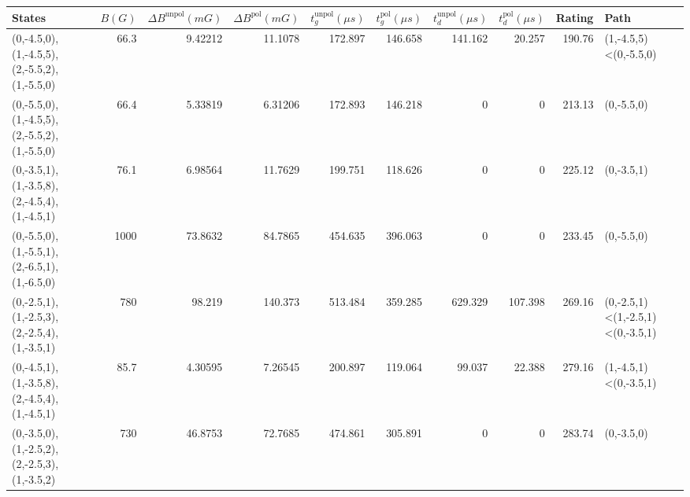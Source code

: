 \begin{tabular}{lrrrrrrrrl}
\hline
 {States}                                    &   {$B(G)$} &   {$\Delta B^{\text{unpol}}(mG)$} &   {$\Delta B^{\text{pol}}(mG)$} &   {$t^{\text{unpol}}_{g}(\mu s)$} &   {$t^{\text{pol}}_{g}(\mu s)$} &   {$t^{\text{unpol}}_{d}(\mu s)$} &   {$t^{\text{pol}}_{d}(\mu s)$} &   {Rating} & {Path}                           \\
\hline
 (0,-4.5,0),(1,-4.5,5),(2,-5.5,2),(1,-5.5,0) &       66.3 &                           9.42212 &                        11.1078  &                           172.897 &                         146.658 &                           141.162 &                          20.257 &     190.76 & (1,-4.5,5)<(0,-5.5,0)            \\
 (0,-5.5,0),(1,-4.5,5),(2,-5.5,2),(1,-5.5,0) &       66.4 &                           5.33819 &                         6.31206 &                           172.893 &                         146.218 &                             0     &                           0     &     213.13 & (0,-5.5,0)                       \\
 (0,-3.5,1),(1,-3.5,8),(2,-4.5,4),(1,-4.5,1) &       76.1 &                           6.98564 &                        11.7629  &                           199.751 &                         118.626 &                             0     &                           0     &     225.12 & (0,-3.5,1)                       \\
 (0,-5.5,0),(1,-5.5,1),(2,-6.5,1),(1,-6.5,0) &     1000   &                          73.8632  &                        84.7865  &                           454.635 &                         396.063 &                             0     &                           0     &     233.45 & (0,-5.5,0)                       \\
 (0,-2.5,1),(1,-2.5,3),(2,-2.5,4),(1,-3.5,1) &      780   &                          98.219   &                       140.373   &                           513.484 &                         359.285 &                           629.329 &                         107.398 &     269.16 & (0,-2.5,1)<(1,-2.5,1)<(0,-3.5,1) \\
 (0,-4.5,1),(1,-3.5,8),(2,-4.5,4),(1,-4.5,1) &       85.7 &                           4.30595 &                         7.26545 &                           200.897 &                         119.064 &                            99.037 &                          22.388 &     279.16 & (1,-4.5,1)<(0,-3.5,1)            \\
 (0,-3.5,0),(1,-2.5,2),(2,-2.5,3),(1,-3.5,2) &      730   &                          46.8753  &                        72.7685  &                           474.861 &                         305.891 &                             0     &                           0     &     283.74 & (0,-3.5,0)                       \\

\end{tabular}
